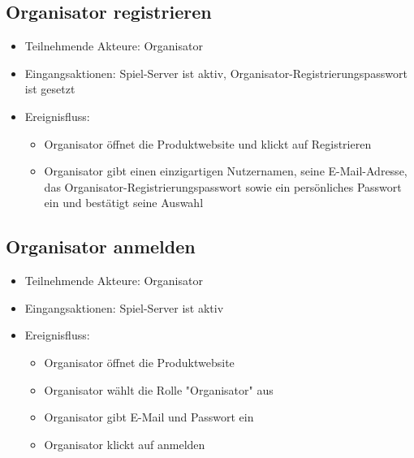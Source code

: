 \documentclass[a4paper]{scrreprt}
\begin{document}
    \subsection{Organisator registrieren}
    \begin{itemize}
        \item Teilnehmende Akteure: \Gls{Organisator}
        \item Eingangsaktionen: \Gls{Spiel-Server} ist aktiv, Organisator-Registrierungspasswort ist gesetzt
        \item Ereignisfluss:
        \begin{itemize}
            \item \Gls{Organisator} öffnet die Produktwebsite und klickt auf Registrieren
            \item \Gls{Organisator} gibt einen einzigartigen Nutzernamen, seine E-Mail-Adresse, das Organisator-Registrierungspasswort sowie ein persönliches Passwort ein und bestätigt seine Auswahl
        \end{itemize}
    \end{itemize}

    \subsection{Organisator anmelden}
    \begin{itemize}
        \item Teilnehmende Akteure: \Gls{Organisator}
        \item Eingangsaktionen: \Gls{Spiel-Server} ist aktiv
        \item Ereignisfluss:
        \begin{itemize}
            \item \Gls{Organisator} öffnet die Produktwebsite
            \item \Gls{Organisator} wählt die Rolle "\Gls{Organisator}" aus
            \item \Gls{Organisator} gibt E-Mail und Passwort ein
            \item \Gls{Organisator} klickt auf anmelden
        \end{itemize}
    \end{itemize}
\end{document}
